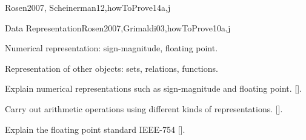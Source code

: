 \begin{syllabus}
\begin{unit}{\DSProofTechniques}{}{Rosen2007, Scheinerman12,howToProve}{14}{a,j}
\begin{learningoutcomes}
    \item \DSProofTechniquesLOIdentifyTheUsed [\Assessment]
    \item \DSProofTechniquesLOOutline [\Usage ]
    \item \DSProofTechniquesLOApplyEach [\Usage ]
    \item \DSProofTechniquesLODetermineWhich [\Assessment]
    \item \DSProofTechniquesLOExplainTheIdeas [\Familiarity ]
    \item \DSProofTechniquesLOExplainTheWeak [\Assessment]
    \item \DSProofTechniquesLOStateThe [\Familiarity]
\end{learningoutcomes}
\end{unit}

\begin{unit}{Data Representation}{}{Rosen2007,Grimaldi03,howToProve}{10}{a,j}
\begin{topics}
    \item Numerical representation: sign-magnitude, floating point.
    \item Representation of other objects: sets, relations, functions.
\end{topics}

\begin{learningoutcomes}
    \item Explain numerical representations such as sign-magnitude and floating point. [\Assessment].
    \item Carry out arithmetic operations using different kinds of representations. [\Assessment].
    \item Explain the floating point standard IEEE-754 [\Familiarity].   
\end{learningoutcomes}
\end{unit}

\begin{coursebibliography}
\end{coursebibliography}

\end{syllabus}

%

